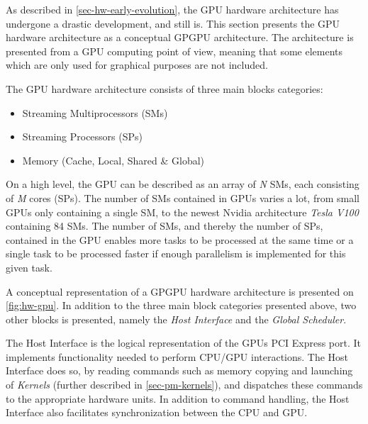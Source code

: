As described in \cref{sec-hw-early-evolution}, the GPU hardware architecture has undergone a drastic development, and still is.
This section presents the GPU hardware architecture as a conceptual GPGPU architecture.
The architecture is presented from a GPU computing point of view, meaning that some elements which are only used for graphical purposes are not included.


The GPU hardware architecture consists of three main blocks categories:
\begin{itemize}
	\item Streaming Multiprocessors (SMs)
	\item Streaming Processors (SPs) 
	\item Memory (Cache, Local, Shared \& Global)
\end{itemize}

On a high level, the GPU can be described as an array of \textit{N} SMs, each consisting of \textit{M} cores (SPs). 
The number of SMs contained in GPUs varies a lot, from small GPUs only containing a single SM, to the newest Nvidia architecture \textit{Tesla V100} containing 84 SMs.
The number of SMs, and thereby the number of SPs, contained in the GPU enables more tasks to be processed at the same time or a single task to be processed faster if enough parallelism is implemented for this given task. 


A conceptual representation of a GPGPU hardware architecture is presented on \cref{fig:hw-gpu}.
In addition to the three main block categories presented above, two other blocks is presented, namely the \textit{Host Interface} and the \textit{Global Scheduler}.

The Host Interface is the logical representation of the GPUs PCI Express port.
It implements functionality needed to perform CPU/GPU interactions. 
The Host Interface does so, by reading commands such as memory copying and launching of \textit{Kernels} (further described in \cref{sec-pm-kernels}), and dispatches these commands to the appropriate hardware units.
In addition to command handling, the Host Interface also facilitates synchronization between the CPU and GPU. 

